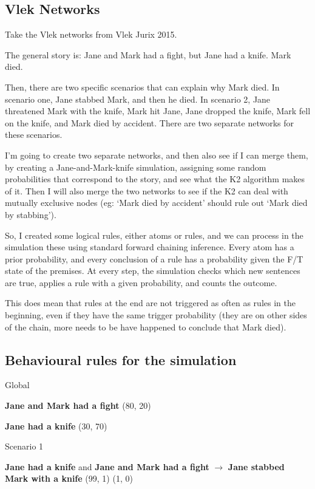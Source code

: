 \subsection{Vlek Networks}
Take the Vlek networks from Vlek Jurix 2015.

The general story is: Jane and Mark had a fight, but Jane had a knife. Mark died. 

Then, there are two specific scenarios that can explain why Mark died. In scenario one, Jane stabbed Mark, and then he died. In scenario 2, Jane threatened Mark with the knife, Mark hit Jane, Jane dropped the knife, Mark fell on the knife, and Mark died by accident. There are two separate networks for these scenarios.

I'm going to create two separate networks, and then also see if I can merge them, by creating a Jane-and-Mark-knife simulation, assigning some random probabilities that correspond to the story, and see what the K2 algorithm makes of it. Then I will also merge the two networks to see if the K2 can deal with mutually exclusive nodes (eg: `Mark died by accident' should rule out `Mark died by stabbing').

So, I created some logical rules, either atoms or rules, and we can process in the simulation these using standard forward chaining inference. Every atom has a prior probability, and every conclusion of a rule has a probability given the F/T state of the premises. At every step, the simulation checks which new sentences are true, applies a rule with a given probability, and counts the outcome.

This does mean that rules at the end are not triggered as often as rules in the beginning, even if they have the same trigger probability (they are on other sides of the chain, more needs to be have happened to conclude that Mark died).

\subsection{Behavioural rules for the simulation}

Global

\textbf{Jane and Mark had a fight} (80, 20)

\textbf{Jane had a knife} (30, 70)


Scenario 1


\textbf{Jane had a knife} and \textbf{Jane and Mark had a fight} $\rightarrow$ \textbf{Jane stabbed Mark with a knife} (99, 1) (1, 0)


